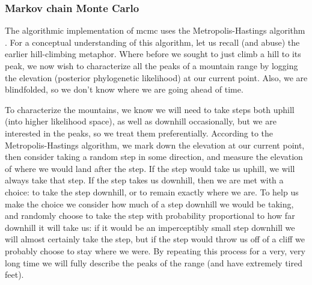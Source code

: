 \subsubsection{Markov chain Monte Carlo}
The algorithmic implementation of \gls{mcmc} uses the Metropolis-Hastings algorithm \citep{metropolis1953equation,hastings1970monte}.
For a conceptual understanding of this algorithm, let us recall (and abuse) the earlier hill-climbing metaphor.
Where before we sought to just climb a hill to its peak, we now wish to characterize all the peaks of a mountain range by logging the elevation (posterior phylogenetic likelihood) at our current point.
Also, we are blindfolded, so we don't know where we are going ahead of time.

To characterize the mountains, we know we will need to take steps both uphill (into higher likelihood space), as well as downhill occasionally, but we are interested in the peaks, so we treat them preferentially.
According to the Metropolis-Hastings algorithm, we mark down the elevation at our current point, then consider taking a random step in some direction, and measure the elevation of where we would land after the step.
If the step would take us uphill, we will always take that step.
If the step takes us downhill, then we are met with a choice: to take the step downhill, or to remain exactly where we are.
To help us make the choice we consider how much of a step downhill we would be taking, and randomly choose to take the step with probability proportional to how far downhill it will take us: if it would be an imperceptibly small step downhill we will almost certainly take the step, but if the step would throw us off of a cliff we probably choose to stay where we were.
By repeating this process for a very, very long time we will fully describe the peaks of the range (and have extremely tired feet).

